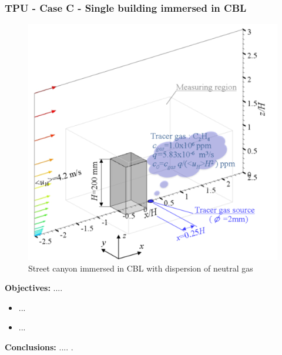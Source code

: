 \subsubsection{TPU - Case C - Single building immersed in CBL}
    \begin{figure}[h!]
        \hypertarget{link:tpu_C}{}
        \centering
        \includegraphics[scale=0.6]{imgs/tpu_dataset_image.png}
        \caption{Street canyon immersed in CBL with dispersion of neutral 
        gas}
    \end{figure}
    \textbf{Objectives:} ....\newline
    \begin{itemize}
        \item ...
        \item ...
    \end{itemize}
    \textbf{Conclusions:} .... .\newline


